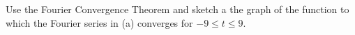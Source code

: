 Use the Fourier Convergence Theorem and sketch a the graph of the function to
which the Fourier series in (a) converges for $-9 \leq t \leq 9$.



